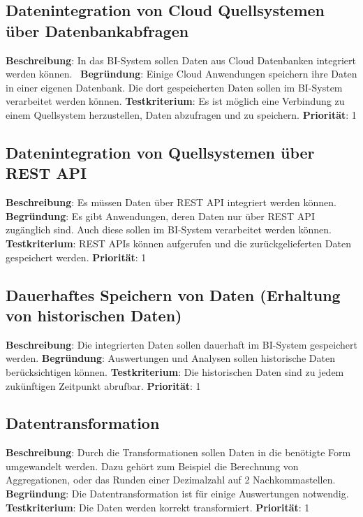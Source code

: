 \subsection{Datenintegration von Cloud Quellsystemen über Datenbankabfragen} \label{sec:anforderungsspezifikation:datenintegrationCloudDB}
\textbf{Beschreibung}: In das BI-System sollen Daten aus Cloud Datenbanken integriert werden können.  
\newline \textbf{Begründung}: Einige Cloud Anwendungen speichern ihre Daten in einer eigenen Datenbank. Die dort gespeicherten Daten sollen im BI-System verarbeitet werden können.
\newline \textbf{Testkriterium}: Es ist möglich eine Verbindung zu einem Quellsystem herzustellen, Daten abzufragen und zu speichern.
\newline \textbf{Priorität}: 1

\subsection{Datenintegration von Quellsystemen über REST API} \label{sec:anforderungsspezifikation:datenintegrationREST}
\textbf{Beschreibung}: Es müssen Daten über REST API integriert werden können. 
\newline \textbf{Begründung}: Es gibt Anwendungen, deren Daten nur über REST API zugänglich sind. Auch diese sollen im BI-System verarbeitet werden können.
\newline \textbf{Testkriterium}: REST APIs können aufgerufen und die zurückgelieferten Daten gespeichert werden.
\newline \textbf{Priorität}: 1

\subsection{Dauerhaftes Speichern von Daten (Erhaltung von historischen Daten)} \label{sec:anforderungsspezifikation:dauerhaftesSpeichern}
\textbf{Beschreibung}: Die integrierten Daten sollen dauerhaft im BI-System gespeichert werden.
\newline \textbf{Begründung}: Auswertungen und Analysen sollen historische Daten berücksichtigen können.
\newline \textbf{Testkriterium}: Die historischen Daten sind zu jedem zukünftigen Zeitpunkt abrufbar.
\newline \textbf{Priorität}: 1

\subsection{Datentransformation} \label{sec:anforderungsspezifikation:datentransformation}
\textbf{Beschreibung}: Durch die Transformationen sollen Daten in die benötigte Form umgewandelt werden. Dazu gehört zum Beispiel die Berechnung von Aggregationen, oder das Runden einer Dezimalzahl auf 2 Nachkommastellen.
\newline \textbf{Begründung}: Die Datentransformation ist für einige Auswertungen notwendig.
\newline \textbf{Testkriterium}: Die Daten werden korrekt transformiert.
\newline \textbf{Priorität}: 1


